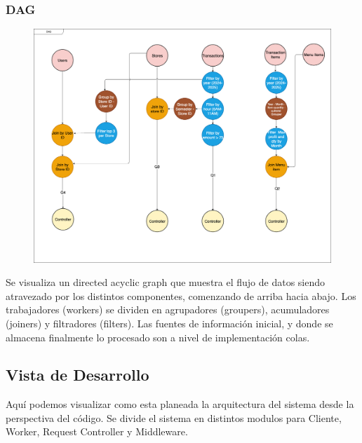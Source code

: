 \documentclass[titlepage,a4paper]{article}
\begin{document}
\subsubsection{DAG}
\begin{figure}[H]
\centering
    \includegraphics[width=1\linewidth]{DAG.png}
\end{figure}
Se visualiza un directed acyclic graph que muestra el flujo de datos siendo atravezado por los distintos componentes, comenzando de arriba hacia abajo. Los trabajadores (workers) se dividen en agrupadores (groupers), acumuladores (joiners) y filtradores (filters). Las fuentes de información inicial, y donde se almacena finalmente lo procesado son a nivel de implementación colas.

\subsection{Vista de Desarrollo}
Aquí podemos visualizar como esta planeada la arquitectura del sistema desde la perspectiva del código. Se divide el sistema en distintos modulos para Cliente, Worker, Request Controller y Middleware.
\end{document}
